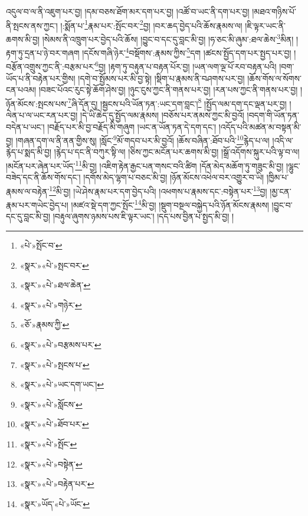འདུལ་བ་ལ་ནི་འཇུག་པར་བྱ། །དམ་བཅས་ཐོག་མར་དག་པར་བྱ། །འཚོ་བ་ཡང་ནི་དག་པར་བྱ། །མཐའ་གཉིས་པོ་ནི་སྤངས་ནས་ཀྱང་། །:སྨོན་པ་\footnote{«པེ་»སྤོང་བ་}རྣམ་པར་:སྤོང་བར་\footnote{«སྣར་»«པེ་»སྤང་བར་}བྱ། །བར་ཆད་བྱེད་པའི་ཆོས་རྣམས་ལ། །ཇི་ལྟར་ཡང་ནི་ཆགས་མི་བྱ། །སེམས་ནི་འཁྲུག་པར་བྱེད་པའི་ཆོས། །བྱུང་བ་དང་དུ་བླང་མི་བྱ། །ཧ་ཅང་མི་ཞུམ་:ཐལ་ཆེས་\footnote{«སྣར་»«པེ་»ཐལ་ཆེན་}མིན། །རྟག་ཏུ་དྲན་པ་ཉེ་བར་གཞག །དངོས་གཞི་ཉེར་\footnote{«སྣར་»«པེ་»གཉེར་}བསྡོགས་:རྣམས་ཀྱིས་\footnote{«ཅོ་»རྣམས་ཀྱི་}དག །ཚངས་སྤྱོད་དག་པར་སྤྱད་པར་བྱ། །བརྩོན་འགྲུས་ཀྱང་ནི་:བརྩམ་པར་\footnote{«སྣར་»«པེ་»བརྩམས་པར་}བྱ། །རྟག་ཏུ་བརྟུན་པ་བརྟན་པོར་བྱ། །ཡན་ལག་ལྔ་པོ་རབ་བརྟན་པའི། །བག་ཡོད་པ་ནི་བརྟེན་པར་གྱིས། །དགེ་བ་སྤྱོམས་པར་མི་བྱ་སྟེ། །སྡིག་པ་རྣམས་ནི་བཤགས་པར་བྱ། །ཆོས་གོས་ལ་སོགས་ངན་པའམ། །བཟང་པོའང་རུང་སྟེ་ཆོག་ཤེས་བྱ། །ཉུང་ངུས་ཀྱང་ནི་གནས་པར་བྱ། །རན་པས་ཀྱང་ནི་གནས་པར་བྱ། །ཉོན་མོངས་:སྤངས་པས་\footnote{«སྣར་»«པེ་»སྤངས་པ་}ཞི་དོན་དུ། །སྦྱངས་པའི་ཡོན་ཏན་:ཡང་དག་བླང་།\footnote{«སྣར་»«པེ་»ཡང་དག་ཡང་།} །སྤྱོད་ལམ་དག་དང་ལྡན་པར་བྱ། །ལེན་པ་ལ་ཡང་རན་པར་བྱ། །དེ་ཡི་ཆེད་དུ་སྤྱོད་ལམ་རྣམས། །བཅོས་པར་ནམས་ཀྱང་མི་བྱའོ། །བདག་གི་ཡོན་ཏན་བདེན་པ་ཡང་། །བརྗོད་པར་མི་བྱ་བརྗོད་མི་གཞུག །ཡང་ན་ཡོན་ཏན་དེ་དག་དང་། །འདོད་པའི་མཚན་མ་བསྟན་མི་བྱ། །གཞན་དག་ལ་ནི་ནན་གྱིས་སུ། །སློང་\footnote{«སྣར་»«པེ་»སློངས་}མོ་གདབ་པར་མི་བྱའོ། །ཆོས་བཞིན་:ཐོབ་པའི་\footnote{«སྣར་»«པེ་»ཐོབ་པར་}རྙེད་པ་ལ། །འདི་ལ་རྙེད་པ་སྨད་མི་བྱ། །རྙེད་པ་དང་ནི་བཀུར་སྟི་ལ། །ཅིས་ཀྱང་མངོན་པར་ཆགས་མི་བྱ། །སྒྲོ་འདོགས་སྐུར་པའི་ལྟ་བ་ལ། །མངོན་པར་ཞེན་པར་ཡོད་\footnote{«སྣར་»«པེ་»སྤོང་}མི་བྱ། །འཇིག་རྟེན་རྒྱང་པན་གསང་བའི་ཚིག །དོན་མེད་མཆོག་ཏུ་གཟུང་མི་བྱ། །ལྷུང་བཟེད་དང་ནི་ཆོས་གོས་དང་། །དགོས་མེད་ལྷག་པ་བཅང་མི་བྱ། །ཉོན་མོངས་འཕེལ་བར་འགྱུར་བ་ཡི། །ཁྱིམ་པ་རྣམས་ལ་བརྟེན་\footnote{«སྣར་»«པེ་»བསྟེན་}མི་བྱ། །ཡེ་ཤེས་རྣམ་པར་དག་བྱེད་པའི། །འཕགས་པ་རྣམས་དང་:བསྟེན་པར་\footnote{«སྣར་»«པེ་»བརྟེན་པར་}བྱ། །མྱ་ངན་རྣམ་པར་གཡེང་བྱེད་པ། །མཛའ་སྡེ་དག་ཀྱང་སྤོང་\footnote{«སྣར་»ཡོད་«པེ་»ཡོང་}མི་བྱ། །སྡུག་བསྔལ་བསྐྱེད་པའི་ཉོན་མོངས་རྣམས། །བྱུང་བ་དང་དུ་བླང་མི་བྱ། །བརྟུལ་ཞུགས་ཉམས་པས་ཇི་ལྟར་ཡང་། །དད་པས་བྱིན་པ་སྤྱད་མི་བྱ། །
